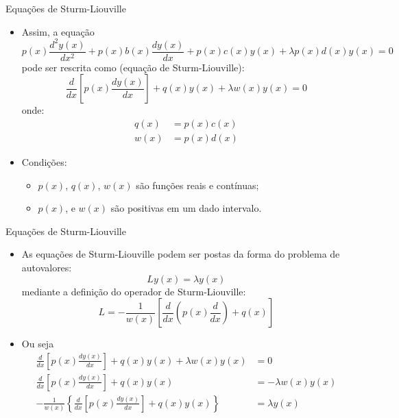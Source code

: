       \begin{slide}[toc=]{Equações de Sturm-Liouville}
		\begin{itemize}
			\item Assim, a equação  
				\begin{equation*}
					p(x)\frac{d^2y(x)}{dx^2} + p(x)b(x)\frac{dy(x)}{dx}+ p(x)c(x)y(x)+\lambda p(x)d(x)y(x) = 0 
				\end{equation*}
				pode ser rescrita como (equação de Sturm-Liouville):
				\begin{equation*}
					\frac{d}{dx}\left [p(x)\frac{dy(x)}{dx} \right ]+ q(x)y(x)+\lambda w(x)y(x) = 0 
				\end{equation*}
				onde:
				\begin{align*}
					q(x) &= p(x)c(x)\\
					w(x) &= p(x)d(x)
				\end{align*}
			\item Condições:
				\begin{itemize}
					\item $p(x)$, $q(x)$, $w(x)$ são funções reais e contínuas;
					\item $p(x)$, e $w(x)$ são positivas em um dado intervalo.
				\end{itemize}
		\end{itemize}
      \end{slide}

      \begin{slide}[toc=]{Equações de Sturm-Liouville}
		\begin{itemize}
			\item As equações de Sturm-Liouville podem ser postas da forma do problema de autovalores:
				\begin{equation*}
					Ly(x) = \lambda y(x)
				\end{equation*}
				mediante a definição do operador de Sturm-Liouville:
				\begin{equation*}
					L = -\frac{1}{w(x)}\left [ \frac{d}{dx}\left ( p(x)\frac{d}{dx} \right ) + q(x) \right ]
				\end{equation*}
			\item Ou seja 
				\begin{align*}
					\frac{d}{dx}\left [p(x)\frac{dy(x)}{dx} \right ]+ q(x)y(x)+\lambda w(x)y(x) &= 0 \\
					\frac{d}{dx}\left [p(x)\frac{dy(x)}{dx} \right ]+ q(x)y(x)&=-\lambda w(x)y(x) \\
					-\frac{1}{w(x)}\left \{\frac{d}{dx}\left [p(x)\frac{dy(x)}{dx} \right ]+ q(x)y(x)\right \} &=\lambda y(x)
				\end{align*}
		\end{itemize}
      \end{slide}
   
